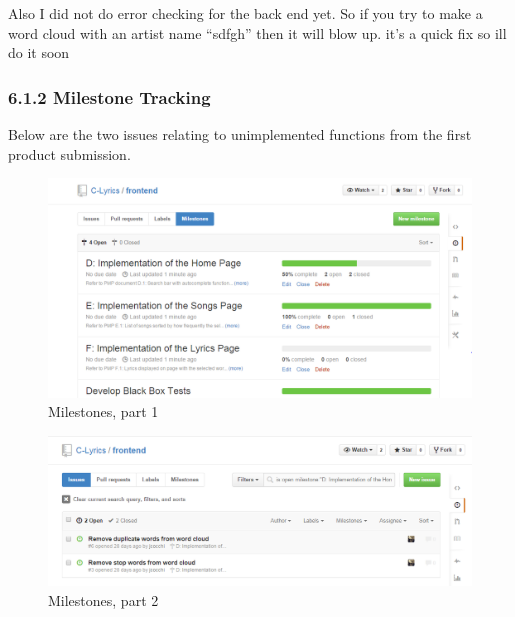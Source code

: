 \documentclass[]{article}
\begin{document}
Also I did not do error checking for the back end yet. So if you try to
make a word cloud with an artist name ``sdfgh'' then it will blow up.
it's a quick fix so ill do it soon

\subsubsection{6.1.2 Milestone
Tracking}\label{milestone-tracking}

Below are the two issues relating to unimplemented functions from the
first product submission.


\begin{figure}[htbp]
\centering
\includegraphics{milestones1.png}
\caption{Milestones, part 1}
\end{figure}


\begin{figure}[htbp]
\centering
\includegraphics{milestones2.png}
\caption{Milestones, part 2}
\end{figure}
\end{document}
